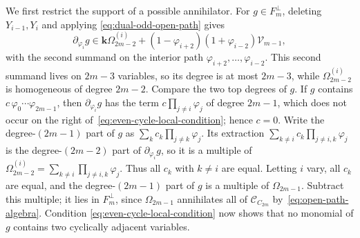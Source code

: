 \documentclass[reqno]{article}
\theoremstyle{plain} %
\theoremstyle{definition}
\theoremstyle{remark}
\newcommand{\K} {\mathbf{k}}
\newcommand {\CC}{\mathscr{C}}
\numberwithin{equation}{section}
\begin{document}
We first restrict the support of a possible annihilator.
For $g\in F_m^\perp$, deleting $Y_{i-1},Y_i$ and applying
\eqref{eq:dual-odd-open-path} gives
\begin{equation}\label{eq:even-cycle-local-condition}
\partial_{\varphi_i}g\in
\K\Omega_{2m-2}^{(i)}+
(1-\varphi_{i+2})(1+\varphi_{i-2})\mathcal V_{m-1},
\end{equation}
with the second summand on the interior path
$\varphi_{i+2},\ldots,\varphi_{i-2}$.
This second summand lives on $2m-3$ variables, so its degree is at most
$2m-3$, while $\Omega^{(i)}_{2m-2}$ is homogeneous of degree $2m-2$.
Compare the two top degrees of $g$. If $g$ contains
$c\,\varphi_0\cdots\varphi_{2m-1}$, then $\partial_{\varphi_i}g$ has the
term $c\prod_{j\ne i}\varphi_j$ of degree $2m-1$, which does not occur on
the right of~\eqref{eq:even-cycle-local-condition}; hence $c=0$. Write
the degree-$(2m-1)$ part of $g$ as $\sum_kc_k\prod_{j\ne k}\varphi_j$.
Its extraction $\sum_{k\ne i}c_k\prod_{j\ne i,k}\varphi_j$ is the
degree-$(2m-2)$ part of $\partial_{\varphi_i}g$, so it is a multiple of
$\Omega^{(i)}_{2m-2}=\sum_{k\ne i}\prod_{j\ne i,k}\varphi_j$. Thus all
$c_k$ with $k\ne i$ are equal. Letting $i$ vary, all $c_k$ are equal,
and the degree-$(2m-1)$ part of $g$ is a multiple of $\Omega_{2m-1}$.
Subtract this multiple; it lies in $F_m^\perp$, since $\Omega_{2m-1}$
annihilates all of $\CC_{C_{2m}}$ by~\eqref{eq:open-path-algebra}. Condition
\eqref{eq:even-cycle-local-condition} now shows that no monomial of $g$
contains two cyclically adjacent variables.
\end{document}
